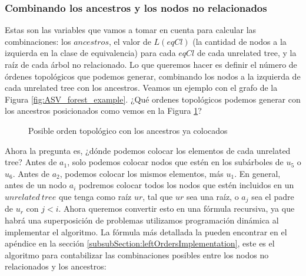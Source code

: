 
\subsubsection{Combinando los ancestros y los nodos no relacionados}

Estas son las variables que vamos a tomar en cuenta para calcular las combinaciones: los $ancestros$, el valor de $L(eqCl)$ (la cantidad de nodos a la izquierda en la clase de equivalencia) para cada $eqCl$ de cada unrelated tree, y la raíz de cada árbol no relacionado. Lo que queremos hacer es definir el número de órdenes topológicos que podemos generar, combinando los nodos a la izquierda de cada unrelated tree con los ancestros. Veamos un ejemplo con el grafo de la Figura \ref{fig:ASV_forest_example}. ¿Qué ordenes topológicos podemos generar con los ancestros posicionados como vemos en la Figura \ref{fig:order_of_ancestors}?

\begin{figure}[ht]
    \centering
    \caption{Posible orden topológico con los ancestros ya colocados}
    \label{fig:order_of_ancestors}
\end{figure}

Ahora la pregunta es, ¿dónde podemos colocar los elementos de cada unrelated tree? Antes de $a_1$, solo podemos colocar nodos que estén en los subárboles de $u_5$ o $u_6$. Antes de $a_2$, podemos colocar los mismos elementos, más $u_1$. En general, antes de un nodo $a_i$ podremos colocar todos los nodos que estén incluidos en un $unrelated \ tree$ que tenga como raíz $ur$, tal que $ur$ sea una raíz, o $a_j$ sea el padre de $u_r$ con $j<i$. Ahora queremos convertir esto en una fórmula recursiva, ya que habrá una superposición de problemas utilizamos programación dinámica al implementar el algoritmo. La fórmula más detallada la pueden encontrar en el apéndice en la sección \ref{subsubSection:leftOrdersImplementation}, este es el algoritmo para contabilizar las combinaciones posibles entre los nodos no relacionados y los ancestros:\\

